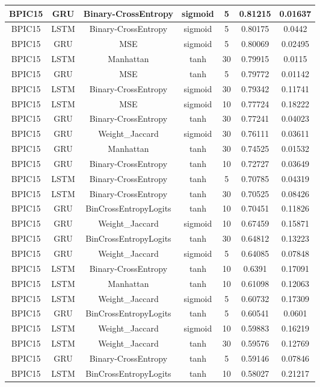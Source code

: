 \documentclass{article}%
\begin{document}
\begin{longtable}{|c|c|c|c|c|c|c|}
\hline%
BPIC15&GRU&Binary{-}CrossEntropy&sigmoid&5&0.81215&0.01637\\%
\hline%
BPIC15&LSTM&Binary{-}CrossEntropy&sigmoid&5&0.80175&0.0442\\%
\hline%
BPIC15&GRU&MSE&sigmoid&5&0.80069&0.02495\\%
\hline%
BPIC15&LSTM&Manhattan&tanh&30&0.79915&0.0115\\%
\hline%
BPIC15&GRU&MSE&tanh&5&0.79772&0.01142\\%
\hline%
BPIC15&LSTM&Binary{-}CrossEntropy&sigmoid&30&0.79342&0.11741\\%
\hline%
BPIC15&LSTM&MSE&sigmoid&10&0.77724&0.18222\\%
\hline%
BPIC15&GRU&Binary{-}CrossEntropy&tanh&30&0.77241&0.04023\\%
\hline%
BPIC15&GRU&Weight\_Jaccard&sigmoid&30&0.76111&0.03611\\%
\hline%
BPIC15&GRU&Manhattan&tanh&30&0.74525&0.01532\\%
\hline%
BPIC15&GRU&Binary{-}CrossEntropy&tanh&10&0.72727&0.03649\\%
\hline%
BPIC15&LSTM&Binary{-}CrossEntropy&tanh&5&0.70785&0.04319\\%
\hline%
BPIC15&LSTM&Binary{-}CrossEntropy&tanh&30&0.70525&0.08426\\%
\hline%
BPIC15&GRU&BinCrossEntropyLogits&tanh&10&0.70451&0.11826\\%
\hline%
BPIC15&GRU&Weight\_Jaccard&sigmoid&10&0.67459&0.15871\\%
\hline%
BPIC15&GRU&BinCrossEntropyLogits&tanh&30&0.64812&0.13223\\%
\hline%
BPIC15&GRU&Weight\_Jaccard&sigmoid&5&0.64085&0.07848\\%
\hline%
BPIC15&LSTM&Binary{-}CrossEntropy&tanh&10&0.6391&0.17091\\%
\hline%
BPIC15&LSTM&Manhattan&tanh&10&0.61098&0.12063\\%
\hline%
BPIC15&LSTM&Weight\_Jaccard&sigmoid&5&0.60732&0.17309\\%
\hline%
BPIC15&GRU&BinCrossEntropyLogits&tanh&5&0.60541&0.0601\\%
\hline%
BPIC15&LSTM&Weight\_Jaccard&sigmoid&10&0.59883&0.16219\\%
\hline%
BPIC15&LSTM&Weight\_Jaccard&tanh&30&0.59576&0.12769\\%
\hline%
BPIC15&GRU&Binary{-}CrossEntropy&tanh&5&0.59146&0.07846\\%
\hline%
BPIC15&LSTM&BinCrossEntropyLogits&tanh&10&0.58027&0.21217\\%

\end{longtable}
\end{document}

